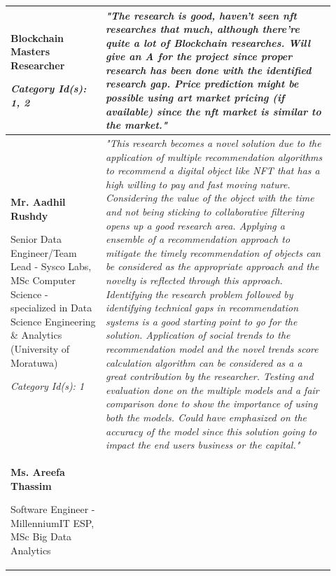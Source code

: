 \begin{longtable}{|p{0.27\linewidth}|p{0.655\linewidth}|}
Blockchain Masters Researcher 

\textit{Category Id(s): 1, 2}
& 
\textit{"The research is good, haven't seen \gls{nft} researches that much, although there're quite a lot of Blockchain researches. Will give an A for the project since proper research has been done with the identified research gap.
Price prediction might be possible using art market pricing (if available) since the \gls{nft} market is similar to the market."}
\\
\hline
\textbf{Mr. Aadhil Rushdy}

Senior Data Engineer/Team Lead - Sysco Labs, MSc Computer Science - specialized in Data Science Engineering \& Analytics (University of Moratuwa)

\textit{Category Id(s): 1}
 &
\textit{"This research becomes a novel solution due to the application of multiple recommendation algorithms to recommend a digital object like NFT that has a high willing to pay and fast moving nature. Considering the value of the object with the time and not being sticking to collaborative filtering opens up a good research area. Applying a ensemble of a recommendation approach to mitigate the timely recommendation of objects can be considered as the appropriate approach and the novelty is reflected through this approach. Identifying the research problem followed by identifying technical gaps in recommendation systems is a good starting point to go for the solution. Application of social trends to the recommendation model and the novel trends score calculation algorithm can be considered as a a great contribution by the researcher. Testing and evaluation done on the multiple models and a fair comparison done to show the importance of using both the models.
Could have emphasized on the accuracy of the model since this solution going to impact the end users business or the capital."}
\\
\hline
\textbf{Ms. Areefa Thassim}

Software Engineer - MillenniumIT ESP,
MSc Big Data Analytics


\end{longtable}
